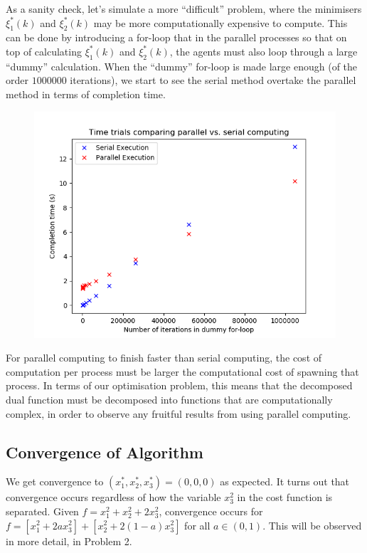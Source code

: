 \documentclass[12pt]{article}
\begin{document}
As a sanity check, let's simulate a more ``difficult'' problem, where the minimisers $\xi_1^*(k)$ and $\xi_2^*(k)$ may be more computationally expensive to compute. This can be done by introducing a for-loop that in the parallel processes so that on top of calculating $\xi_1^*(k)$ and $\xi_2^*(k)$, the agents must also loop through a large ``dummy'' calculation. When the ``dummy'' for-loop is made large enough (of the order $1000000$ iterations), we start to see the serial method overtake the parallel method in terms of completion time.

\begin{figure}[H]
	\includegraphics[scale=1]{Problem1-TimeTrial.png}
\end{figure}

For parallel computing to finish faster than serial computing, the cost of computation per process must be larger the computational cost of spawning that process. In terms of our optimisation problem, this means that the decomposed dual function must be decomposed into functions that are computationally complex, in order to observe any fruitful results from using parallel computing.

\subsection*{Convergence of Algorithm}

We get convergence to $(x_1^*,x_2^*,x_3^*)=(0,0,0)$ as expected. It turns out that convergence occurs regardless of how the variable $x_3^2$ in the cost function is separated. Given $f=x_1^2+x_2^2+2x_3^2$, convergence occurs for $f=[x_1^2+2ax_3^2]+[x_2^2+2(1-a)x_3^2]$ for all $a\in(0,1)$. This will be observed in more detail, in Problem 2.
\end{document}
